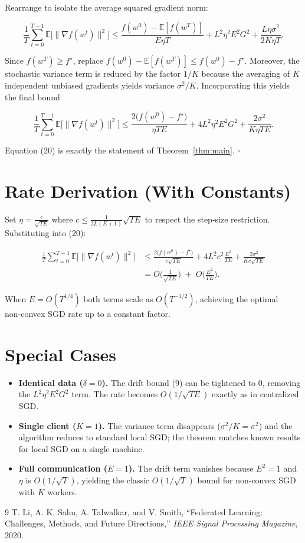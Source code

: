 \documentclass{article}
\newcommand{\E}{\mathbb{E}}
\begin{document}
Rearrange to isolate the average squared gradient norm:

\[
\frac{1}{T}\sum_{t=0}^{T-1}\E\!\big[\|\nabla f(w^{t})\|^{2}\big]
\le
\frac{f(w^{0})- \E[f(w^{T})]}{E\eta T}
+ L^{2}\eta^{2}E^{2}G^{2}
+\frac{L\eta\sigma^{2}}{2K\eta T} .
\tag{19}
\]

Since $f(w^{T})\ge f^{\star}$, replace $f(w^{0})- \E[f(w^{T})]\le f(w^{0})-f^{\star}$. Moreover, the stochastic variance term is reduced by the factor $1/K$ because the averaging of $K$ independent unbiased gradients yields variance $\sigma^{2}/K$. Incorporating this yields the final bound

\[
\frac{1}{T}\sum_{t=0}^{T-1}\E\!\big[\|\nabla f(w^{t})\|^{2}\big]
\le
\frac{2\big(f(w^{0})-f^{\star}\big)}{\eta TE}
+4L^{2}\eta^{2}E^{2}G^{2}
+\frac{2\sigma^{2}}{K\eta TE}.
\tag{20}
\]

Equation (20) is exactly the statement of Theorem~\ref{thm:main}. \hfill $\square$

\section*{Rate Derivation (With Constants)}
Set $\eta = \frac{c}{\sqrt{TE}}$ where $c\le \frac{1}{2L(E+1)}\sqrt{TE}$ to respect the step‑size restriction. Substituting into (20):

\[
\begin{aligned}
\frac{1}{T}\sum_{t=0}^{T-1}\E\!\big[\|\nabla f(w^{t})\|^{2}\big]
&\le
\frac{2\big(f(w^{0})-f^{\star}\big)}{c\sqrt{TE}}
+4L^{2}c^{2}\frac{E^{2}}{TE}
+\frac{2\sigma^{2}}{Kc\sqrt{TE}}\\[0.4em]
&= O\!\Big(\frac{1}{\sqrt{TE}}\Big)
\;+\;O\!\Big(\frac{E^{2}}{TE}\Big).
\end{aligned}
\]

When $E=O(T^{1/4})$ both terms scale as $O(T^{-1/2})$, achieving the optimal non‑convex SGD rate up to a constant factor.

\section*{Special Cases}
\begin{itemize}
    \item \textbf{Identical data ($\delta=0$).} The drift bound (9) can be tightened to $0$, removing the $L^{2}\eta^{2}E^{2}G^{2}$ term. The rate becomes $O(1/\sqrt{TE})$ exactly as in centralized SGD.
    \item \textbf{Single client ($K=1$).} The variance term disappears ($\sigma^{2}/K=\sigma^{2}$) and the algorithm reduces to standard local SGD; the theorem matches known results for local SGD on a single machine.
    \item \textbf{Full communication ($E=1$).} The drift term vanishes because $E^{2}=1$ and $\eta$ is $O(1/\sqrt{T})$, yielding the classic $O(1/\sqrt{T})$ bound for non‑convex SGD with $K$ workers.
\end{itemize}

\begin{thebibliography}{9}
T. Li, A. K. Sahu, A. Talwalkar, and V. Smith, ``Federated Learning: Challenges, Methods, and Future Directions,'' \emph{IEEE Signal Processing Magazine}, 2020.
\end{thebibliography}
\end{document}
